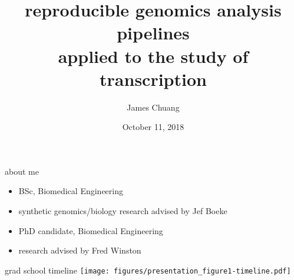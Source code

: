 \documentclass[aspectratio=169]{beamer}
\title{reproducible genomics analysis pipelines\\applied to the study of transcription}
\author{James Chuang}
\date{October 11, 2018}
\begin{document}
\begin{frame}
    \titlepage
\end{frame}

\begin{frame}{about me}
    \begin{description}[align=right]
        \setlength{\itemsep}{1cm}
        \item[undergrad:]
            \begin{itemize}
                \item BSc, Biomedical Engineering
                \item synthetic genomics/biology research advised by Jef Boeke
            \end{itemize}
        \item[currently:]
            \begin{itemize}
                \item PhD candidate, Biomedical Engineering
                \item research advised by Fred Winston
            \end{itemize}
    \end{description}
\end{frame}

\begin{frame}{grad school timeline}
\texttt{[image: figures/presentation\_figure1-timeline.pdf]}
\end{frame}

{
    \begin{frame}[plain]
    \end{frame}
}
\end{document}
